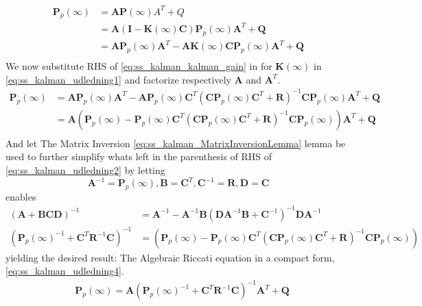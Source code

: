 \begin{equation}
	\begin{split}\label{eq:ss_kalman_udledning1}
		\textbf{P}_p(\infty) 	& = \textbf{A}\textbf{P}(\infty)A^T + Q \\
		& = \textbf{A} (\textbf{I}-\textbf{K}(\infty)\textbf{C}) \textbf{P}_p(\infty) \textbf{A}^T + \textbf{Q}\\
		& = \textbf{A} \textbf{P}_p(\infty) \textbf{A}^T - \textbf{A} \textbf{K}(\infty) \textbf{C} \textbf{P}_p(\infty)  \textbf{A}^T + \textbf{Q}\\
		\end{split}
\end{equation}
We now substitute RHS of \cref{eq:ss_kalman_kalman_gain} in for $\textbf{K}(\infty)$ in \cref{eq:ss_kalman_udledning1} and factorize respectively $\textbf{A}$ and $ \textbf{A}^T $.
\begin{equation}
	\begin{split}\label{eq:ss_kalman_udledning2}
		\textbf{P}_p(\infty) & = \textbf{A} \textbf{P}_p(\infty) \textbf{A}^T - \textbf{A} \textbf{P}_p(\infty) \textbf{C}^T (\textbf{C} \textbf{P}_p(\infty) \textbf{C}^T + \textbf{R})^{-1} \textbf{C} \textbf{P}_p(\infty) \textbf{A}^T + \textbf{Q}\\
		& = \textbf{A} (\textbf{P}_p(\infty) - \textbf{P}_p(\infty) \textbf{C}^T (\textbf{C} \textbf{P}_p(\infty) \textbf{C}^T + \textbf{R})^{-1} \textbf{C} \textbf{P}_p(\infty)) \textbf{A}^T + \textbf{Q}\\
	\end{split}
\end{equation}
And let The Matrix Inversion \cref{eq:ss_kalman_MatrixInversionLemma} lemma be used to further simplify whats left in the parenthesis of RHS of \cref{eq:ss_kalman_udledning2} by letting
\begin{equation}
		\textbf{A}^{-1} = \textbf{P}_p(\infty), \textbf{B} = \textbf{C}^T, \textbf{C}^{-1} = \textbf{R}, \textbf{D} = \textbf{C} \label{eq:ss_kalman_udledning3}
\end{equation}
enables 
\begin{align}
		(\textbf{A}+\textbf{BCD})^{-1} &= \textbf{A}^{-1} - \textbf{A}^{-1}\textbf{B} (\textbf{D}\textbf{A}^{-1}\textbf{B}+\textbf{C}^{-1})^{-1}\textbf{D}\textbf{A}^{-1} \\ \label{eq:ss_kalman_MatrixInversionLemma}
		(\textbf{P}_p(\infty)^{-1} + \textbf{C}^T \textbf{R}^{-1} \textbf{C})^{-1} &= (\textbf{P}_p(\infty) - \textbf{P}_p(\infty) \textbf{C}^T (\textbf{C} \textbf{P}_p(\infty) \textbf{C}^T + \textbf{R})^{-1} \textbf{C} \textbf{P}_p(\infty))
\end{align}
yielding the desired result: The Algebraic Riccati equation in a compact form, \cref{eq:ss_kalman_udledning4}.
\begin{equation}
	\begin{split}\label{eq:ss_kalman_udledning4}
		&\textbf{P}_p(\infty) = \textbf{A} (\textbf{P}_p(\infty)^{-1} + \textbf{C}^T \textbf{R}^{-1} \textbf{C})^{-1} \textbf{A}^T + \textbf{Q}\\
	\end{split}
\end{equation}


